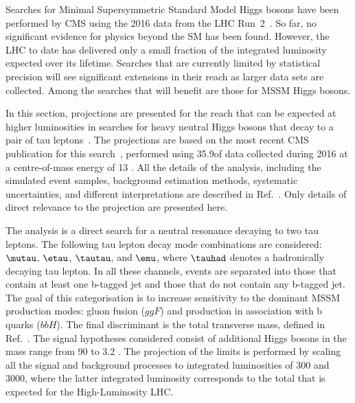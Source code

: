 Searches for Minimal Supersymmetric Standard Model  Higgs bosons have been performed by CMS using
the 2016 data from the LHC Run~2~\cite{HIG-18-014,HIG-16-018,HIG-17-020}.
So far,
no significant evidence for physics beyond the SM has been found.
However, the LHC to date has delivered only a small fraction of the
integrated luminosity expected over its lifetime.
Searches that are currently limited by statistical precision
will see significant extensions in their reach as larger data sets are collected.
Among the searches that will benefit are those for MSSM Higgs bosons.

In this section,
projections are presented for the reach that can be expected at higher luminosities
in searches for heavy neutral Higgs bosons that decay to a pair of tau leptons~\cite{CMS-PAS-FTR-18-017}.
The projections are based on the most recent CMS publication
for this search~\cite{HIG-17-020},
performed using 35.9\fbinv of data collected during 2016
at a centre-of-mass energy of 13 \UTeV.
All the details of the analysis,
including the simulated event samples, background estimation methods,
systematic uncertainties, and different interpretations are described in Ref.~\cite{HIG-17-020}.
Only details of direct relevance to the projection are presented here.

The analysis is a direct search for a neutral resonance
decaying to two tau leptons.
The following tau lepton decay mode combinations are considered: $\mutau$, $\etau$,
$\tautau$, and $\emu$, where $\tauhad$ denotes a hadronically decaying tau lepton.
In all these channels, events are separated into those that contain
at least one b-tagged jet and those that do not contain any b-tagged jet. 
The goal of this categorisation is to increase sensitivity to the dominant MSSM production modes: 
gluon fusion ($ggF$) and production in association with b quarks ($bbH$).
The final discriminant is the total 
transverse mass, defined in Ref.~\cite{HIG-17-020}.
The signal hypotheses considered consist of additional Higgs
bosons in the mass range from 90 \UGeV to 3.2 \UTeV.
The projection of the limits %
is performed by scaling all the signal
and background processes to integrated luminosities
of 300 and 3000\fbinv,
where the latter integrated luminosity corresponds to the total that is
expected for the High-Luminosity LHC. 

